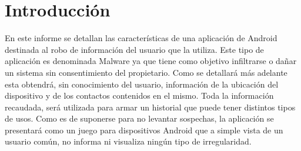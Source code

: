 \section{Introducción}
En este informe se detallan las caracter\'isticas de una aplicaci\'on de Android destinada al robo de informaci\'on del usuario que la utiliza.
Este tipo de aplicaci\'on es denominada Malware ya que tiene como objetivo infiltrarse o dañar un sistema sin consentimiento del propietario.
Como se detallar\'a m\'as adelante esta obtendr\'a, sin conocimiento del usuario, informaci\'on  de la ubicaci\'on del dispositivo y de los contactos contenidos en el mismo.
Toda la informaci\'on recaudada, ser\'a utilizada para armar un historial que puede tener distintos tipos de usos.
Como es de suponerse para no levantar sospechas, la aplicaci\'on se presentar\'a como un juego para dispositivos Android que a simple vista de un usuario com\'un, no informa ni visualiza ning\'un tipo de irregularidad.
